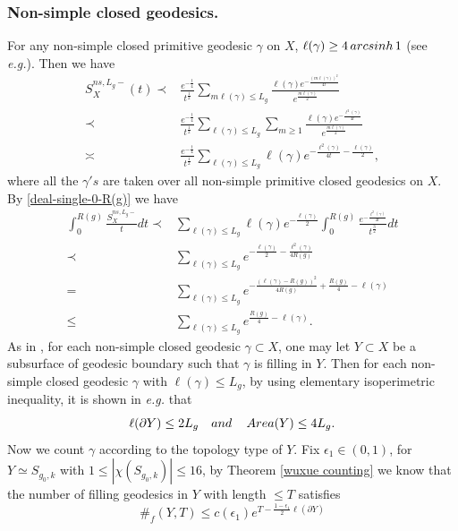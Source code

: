 \documentclass[11pt]{amsart}
\makeatletter
\newcommand{\eg}{\textit{e.g.\@ }}
\def\area{\mathop{\rm Area}}
\def\arcsinh{\mathop{\rm arcsinh}}
\theoremstyle{plain}
\theoremstyle{definition}
\theoremstyle{remark}
\makeatother
\begin{document}
\subsubsection{Non-simple closed geodesics.} For any non-simple  closed primitive geodesic $\gamma$ on $X$, $\ell(\gamma)\geq 4\arcsinh 1$ (see \eg \cite{buser2010geometry}). Then we have  
\begin{equation}\label{bound nonsimple SXt}
  \begin{aligned}
     S_X^{ns,L_g-}(t)  \prec & \frac{e^{-\frac{t}{4}}}{t^\frac{1}{2}}\sum_{m\ell(\gamma)\leq L_g}\frac{\ell(\gamma)e^{-\frac{(m\ell(\gamma))^2}{4t}}}{e^{\frac{m\ell(\gamma)}{2}}}\\
     \prec&  \frac{e^{-\frac{t}{4}}}{t^\frac{1}{2}}\sum_{\ell(\gamma)\leq L_g}\sum_{m\geq 1}\frac{\ell(\gamma)e^{-\frac{\ell^2(\gamma)}{4t}}}{e^{\frac{m\ell(\gamma)}{2}}}\\
\asymp&\frac{e^{-\frac{t}{4}}}{t^\frac{1}{2}}\sum_{\ell(\gamma)\leq L_g}\ell(\gamma)e^{-\frac{\ell^2(\gamma)}{4t}-\frac{\ell(\gamma)}{2}},
  \end{aligned}\nonumber
   \end{equation}
  where all the $\gamma's$ are taken over all non-simple primitive closed geodesics on $X$.  
By \eqref{deal-single-0-R(g)} we have
\begin{equation}\label{bound int sxt}
      \begin{aligned}
 \int_0^{R(g)}\frac{S_X^{ns,L_g-}}{t}dt \prec& \sum_{\ell(\gamma)\leq L_g}\ell(\gamma)e^{-\frac{\ell(\gamma)}{2}}\int_0^{R(g)}\frac{e^{-\frac{\ell^2(\gamma)}{4t}}}{t^{\frac{3}{2}}}dt\\
\prec& \sum_{\ell(\gamma)\leq L_g}e^{-\frac{\ell(\gamma)}{2}-\frac{\ell^2(\gamma)}{4R(g)}}\\
=&\sum_{\ell(\gamma)\leq L_g}e^{ -\frac{(\ell(\gamma)-R(g))^2}{4R(g)}+\frac{R(g)}{4}-\ell(\gamma)}\\
\leq&\sum_{\ell(\gamma)\leq L_g}e^{\frac{R(g)}{4}-\ell(\gamma)}.
\end{aligned}
  \end{equation}
As in \cite{MP19, nie2023large,wu2022random}, for each non-simple closed geodesic $\gamma\subset X$, one may let $Y\subset X$ be a subsurface of geodesic boundary such that $\gamma$ is filling in $Y$. Then for each non-simple closed geodesic $\gamma$ with $\ell(\gamma)\leq L_g$, by using elementary isoperimetric inequality, it is shown in \eg \cite[Proposition 7]{wu2022random} that
\[\ell(\partial Y)\leq 2L_g \quad \textit{and} \quad \area(Y)\leq 4L_g.\]
Now we count $\gamma$ according to the topology type of $Y$. Fix $\epsilon_1\in(0,1)$,  for $Y\simeq S_{g_0,k}$ with $1\leq |\chi(S_{g_0,k})|\leq 16$, by Theorem \ref{wuxue counting} we know that the number of filling geodesics in $Y$ with length $\leq T$ satisfies $$
 \#_f(Y,T)\leq c(\epsilon_1)e^{T-\frac{1-\epsilon_1}{2}\ell(\partial 
 Y)}
 $$
\end{document}
